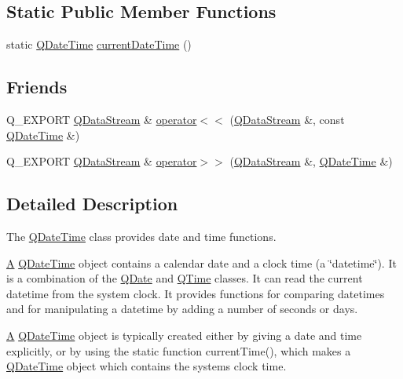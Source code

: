 \subsection*{Static Public Member Functions}
\begin{DoxyCompactItemize}
\item 
static \mbox{\hyperlink{class_q_date_time}{Q\+Date\+Time}} \mbox{\hyperlink{class_q_date_time_a1e8e27c71617d5c97abe80ee2426a1b4}{current\+Date\+Time}} ()
\end{DoxyCompactItemize}
\subsection*{Friends}
\begin{DoxyCompactItemize}
\item 
Q\+\_\+\+E\+X\+P\+O\+RT \mbox{\hyperlink{class_q_data_stream}{Q\+Data\+Stream}} \& \mbox{\hyperlink{class_q_date_time_ac4f6ae497406f297a47183ecc265816a}{operator$<$$<$}} (\mbox{\hyperlink{class_q_data_stream}{Q\+Data\+Stream}} \&, const \mbox{\hyperlink{class_q_date_time}{Q\+Date\+Time}} \&)
\item 
Q\+\_\+\+E\+X\+P\+O\+RT \mbox{\hyperlink{class_q_data_stream}{Q\+Data\+Stream}} \& \mbox{\hyperlink{class_q_date_time_afb6acd9837e7b1d8fc54e6665a9adc29}{operator$>$$>$}} (\mbox{\hyperlink{class_q_data_stream}{Q\+Data\+Stream}} \&, \mbox{\hyperlink{class_q_date_time}{Q\+Date\+Time}} \&)
\end{DoxyCompactItemize}


\subsection{Detailed Description}
The \mbox{\hyperlink{class_q_date_time}{Q\+Date\+Time}} class provides date and time functions. 

\mbox{\hyperlink{class_a}{A}} \mbox{\hyperlink{class_q_date_time}{Q\+Date\+Time}} object contains a calendar date and a clock time (a \char`\"{}datetime\char`\"{}). It is a combination of the \mbox{\hyperlink{class_q_date}{Q\+Date}} and \mbox{\hyperlink{class_q_time}{Q\+Time}} classes. It can read the current datetime from the system clock. It provides functions for comparing datetimes and for manipulating a datetime by adding a number of seconds or days.

\mbox{\hyperlink{class_a}{A}} \mbox{\hyperlink{class_q_date_time}{Q\+Date\+Time}} object is typically created either by giving a date and time explicitly, or by using the static function current\+Time(), which makes a \mbox{\hyperlink{class_q_date_time}{Q\+Date\+Time}} object which contains the system\textquotesingle{}s clock time.

